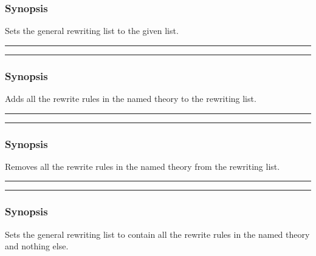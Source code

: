 \subsubsection*{Synopsis}
Sets the general rewriting list to the given list.

\vspace{2mm}
\hrule
\vspace{2mm}
\begin{Large}
\end{Large}
\vspace{2mm}
\hrule
\vspace{2mm}


\subsubsection*{Synopsis}
Adds all the rewrite rules in the named theory to the rewriting
list.

\vspace{2mm}
\hrule
\vspace{2mm}
\begin{Large}
\end{Large}
\vspace{2mm}
\hrule
\vspace{2mm}


\subsubsection*{Synopsis}
Removes all the rewrite rules in the named theory from the  rewriting
list.

\vspace{2mm}
\hrule
\vspace{2mm}
\begin{Large}
\end{Large}
\vspace{2mm}
\hrule
\vspace{2mm}


\subsubsection*{Synopsis}
Sets the general rewriting list to contain all the rewrite rules in
the named theory and nothing else.

